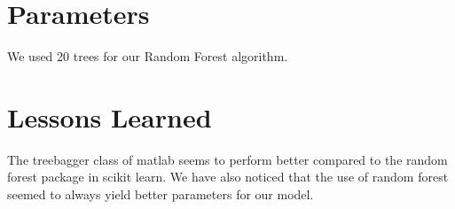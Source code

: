 \documentclass[a4paper, 11pt]{article}
\begin{document}
\section{Parameters}
We used 20 trees for our Random Forest algorithm.

\section{Lessons Learned} The treebagger class of matlab seems to perform better  compared to the random forest package in scikit learn. We have also noticed that the use of random forest seemed to always yield better parameters for our model.
\end{document}
